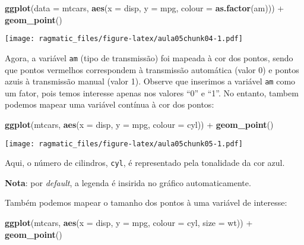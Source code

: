 \documentclass[]{book}
\newenvironment{Shaded}{\begin{snugshade}}{\end{snugshade}}
\newcommand{\KeywordTok}[1]{\textcolor[rgb]{0.13,0.29,0.53}{\textbf{{#1}}}}
\newcommand{\DataTypeTok}[1]{\textcolor[rgb]{0.13,0.29,0.53}{{#1}}}
\newcommand{\StringTok}[1]{\textcolor[rgb]{0.31,0.60,0.02}{{#1}}}
\newcommand{\NormalTok}[1]{{#1}}
\begin{document}
\begin{Shaded}
\begin{Highlighting}[]
\KeywordTok{ggplot}\NormalTok{(}\DataTypeTok{data =} \NormalTok{mtcars, }\KeywordTok{aes}\NormalTok{(}\DataTypeTok{x =} \NormalTok{disp, }\DataTypeTok{y =} \NormalTok{mpg, }\DataTypeTok{colour =} \KeywordTok{as.factor}\NormalTok{(am))) +}\StringTok{ }
\StringTok{  }\KeywordTok{geom_point}\NormalTok{()}
\end{Highlighting}
\end{Shaded}

\texttt{[image: ragmatic\_files/figure-latex/aula05chunk04-1.pdf]}

Agora, a variável \texttt{am} (tipo de transmissão) foi mapeada à cor
dos pontos, sendo que pontos vermelhos correspondem à transmissão
automática (valor 0) e pontos azuis à transmissão manual (valor 1).
Observe que inserimos a variável \texttt{am} como um fator, pois temos
interesse apenas nos valores ``0'' e ``1''. No entanto, tambem podemos
mapear uma variável contínua à cor dos pontos:

\begin{Shaded}
\begin{Highlighting}[]
\KeywordTok{ggplot}\NormalTok{(mtcars, }\KeywordTok{aes}\NormalTok{(}\DataTypeTok{x =} \NormalTok{disp, }\DataTypeTok{y =} \NormalTok{mpg, }\DataTypeTok{colour =} \NormalTok{cyl)) +}\StringTok{ }
\StringTok{  }\KeywordTok{geom_point}\NormalTok{()}
\end{Highlighting}
\end{Shaded}

\texttt{[image: ragmatic\_files/figure-latex/aula05chunk05-1.pdf]}

Aqui, o número de cilindros, \texttt{cyl}, é representado pela
tonalidade da cor azul.

\textbf{Nota}: por \emph{default}, a legenda é insirida no gráfico
automaticamente.

Também podemos mapear o tamanho dos pontos à uma variável de interesse:

\begin{Shaded}
\begin{Highlighting}[]
\KeywordTok{ggplot}\NormalTok{(mtcars, }\KeywordTok{aes}\NormalTok{(}\DataTypeTok{x =} \NormalTok{disp, }\DataTypeTok{y =} \NormalTok{mpg, }\DataTypeTok{colour =} \NormalTok{cyl, }\DataTypeTok{size =} \NormalTok{wt)) +}
\StringTok{  }\KeywordTok{geom_point}\NormalTok{()}
\end{Highlighting}
\end{Shaded}
\end{document}
